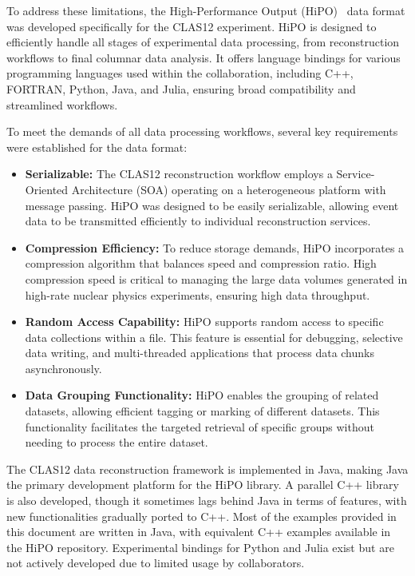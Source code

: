 \documentclass[preprint,12pt]{elsarticle}
\begin{document}
To address these limitations, the High-Performance Output (HiPO)~\cite{hipo5p0:2025jk} data format was developed specifically for the CLAS12 experiment. HiPO is designed to efficiently handle all stages of experimental data processing, from reconstruction workflows to final columnar data analysis. It offers language bindings for various programming languages used within the collaboration, including C++, FORTRAN, Python, Java, and Julia, ensuring broad compatibility and streamlined workflows.

To meet the demands of all data processing workflows, several key requirements were established for the data format:
\begin{itemize}
\item {\bf Serializable:} The CLAS12 reconstruction workflow employs a Service-Oriented Architecture (SOA) operating on a heterogeneous platform with message passing. HiPO was designed to be easily serializable, allowing event data to be transmitted efficiently to individual reconstruction services.
\item {\bf Compression Efficiency:} To reduce storage demands, HiPO incorporates a compression algorithm that balances speed and compression ratio. High compression speed is critical to managing the large data volumes generated in high-rate nuclear physics experiments, ensuring high data throughput.
\item {\bf  Random Access Capability:} HiPO supports random access to specific data collections within a file. This feature is essential for debugging, selective data writing, and multi-threaded applications that process data chunks asynchronously.
\item {\bf Data Grouping Functionality:} HiPO enables the grouping of related datasets, allowing efficient tagging or marking of different datasets. This functionality facilitates the targeted retrieval of specific groups without needing to process the entire dataset.
\end{itemize}
The CLAS12 data reconstruction framework is implemented in Java, making Java the primary development platform for the HiPO library. A parallel C++ library is also developed, though it sometimes lags behind Java in terms of features, with new functionalities gradually ported to C++. Most of the examples provided in this document are written in Java, with equivalent C++ examples available in the HiPO repository. Experimental bindings for Python and Julia exist but are not actively developed due to limited usage by collaborators.
\end{document}

